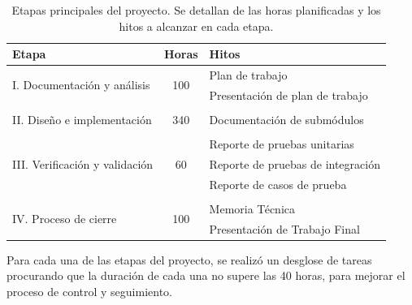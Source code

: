 \begin{table}[ht]
\centering
\caption[Etapas principales del proyecto]{Etapas principales del proyecto. Se detallan de las horas planificadas y los hitos a alcanzar en cada etapa.}
\label{tab:planificacion}
\begin{tabular}{lcl}
\toprule
\textbf{Etapa}                            & \textbf{Horas}       & \textbf{Hitos}                                \\ \midrule
\multirow{2}{*}{I. Documentación y análisis} & \multirow{2}{*}{100} & Plan de trabajo                             \\
                                          &                      & Presentación de plan de trabajo \vspace{5px}\\
                                          & \multicolumn{1}{l}{} &                                             \\ 
II. Diseño e implementación                   & 340                  & Documentación de submódulos  \vspace{5px}   \\
                                          & \multicolumn{1}{l}{} &                                             \\ 
               							  &                      & Reporte de pruebas unitarias                \\
III. Verificación y validación                 & 60                   & Reporte de pruebas de integración           \\
                                          &                      & Reporte de casos de prueba   \vspace{5px}   \\
                                          & \multicolumn{1}{l}{} &                                             \\ 
\multirow{2}{*}{IV. Proceso de cierre}        & \multirow{2}{*}{100} & Memoria Técnica                             \\
                                          &                      & Presentación de Trabajo Final               \\ \bottomrule
\end{tabular}
\end{table}

\vspace{20px}

Para cada una de las etapas del proyecto, se realizó un desglose de tareas procurando que la duración de cada una no supere las 40 horas, para mejorar el proceso de control y seguimiento.

